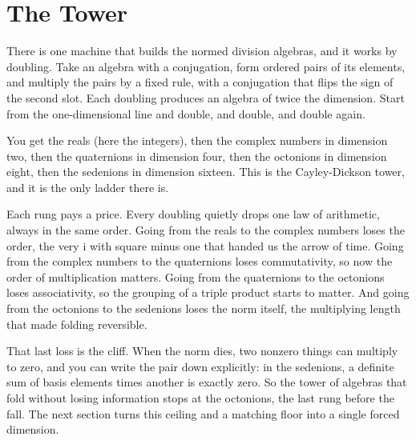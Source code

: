 \section{The Tower}

There is one machine that builds the normed division algebras, and it works by doubling. Take an algebra with a conjugation, form ordered pairs of its elements, and multiply the pairs by a fixed rule, with a conjugation that flips the sign of the second slot. Each doubling produces an algebra of twice the dimension. Start from the one-dimensional line and double, and double, and double again.

You get the reals (here the integers), then the complex numbers in dimension two, then the quaternions in dimension four, then the octonions in dimension eight, then the sedenions in dimension sixteen. This is the Cayley-Dickson tower, and it is the only ladder there is.

Each rung pays a price. Every doubling quietly drops one law of arithmetic, always in the same order. Going from the reals to the complex numbers loses the order, the very i with square minus one that handed us the arrow of time. Going from the complex numbers to the quaternions loses commutativity, so now the order of multiplication matters. Going from the quaternions to the octonions loses associativity, so the grouping of a triple product starts to matter. And going from the octonions to the sedenions loses the norm itself, the multiplying length that made folding reversible.

That last loss is the cliff. When the norm dies, two nonzero things can multiply to zero, and you can write the pair down explicitly: in the sedenions, a definite sum of basis elements times another is exactly zero. So the tower of algebras that fold without losing information stops at the octonions, the last rung before the fall. The next section turns this ceiling and a matching floor into a single forced dimension.
